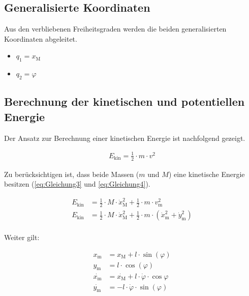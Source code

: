 \documentclass[
	pagesize,
	fontsize=12pt,
	paper=a4,
	oneside,
   reqno
]{scrartcl}
\begin{document}
\subsection{Generalisierte Koordinaten}

Aus den verbliebenen Freiheitsgraden werden die beiden generalisierten Koordinaten abgeleitet.

\begin{itemize}
    \item $q_{\mathrm{1}} = x_{\mathrm{M}}$
    \item $q_{\mathrm{2}} = \varphi$
\end{itemize}

\subsection{Berechnung der kinetischen und potentiellen Energie}

Der Ansatz zur Berechnung einer kinetischen Energie ist nachfolgend gezeigt.

\begin{align}\label{eq:Gleichung2}
    E_{\mathrm{kin}} = \frac{1}{2} \cdot m \cdot v^2
\end{align}

Zu berücksichtigen ist, dass beide Massen ($m$ und $M$) eine kinetische Energie besitzen (\autoref{eq:Gleichung3} und \autoref{eq:Gleichung4}).

\begin{align}
    E_{\mathrm{kin}} &= \frac{1}{2} \cdot M \cdot \dot{x}_{\mathrm{M}}^2 + \frac{1}{2} \cdot m \cdot v_{\mathrm{m}}^2 \label{eq:Gleichung3} \\
    E_{\mathrm{kin}} &= \frac{1}{2} \cdot M \cdot \dot{x}_{\mathrm{M}}^2 + \frac{1}{2} \cdot m \cdot \left(\dot{x}_{\mathrm{m}}^2 + \dot{y}_{\mathrm{m}}^2\right) \label{eq:Gleichung4}
\end{align} \\

Weiter gilt:

\begin{align*}
    x_{\mathrm{m}} &= x_{\mathrm{M}} + l \cdot \sin({\varphi}) \\
    y_{\mathrm{m}} &= l \cdot \cos({\varphi}) \\
    \dot{x_{\mathrm{m}}} &= \dot{x_{\mathrm{M}}} + l \cdot \dot{\varphi} \cdot \cos{\varphi} \\
    \dot{y_{\mathrm{m}}} &= -l \cdot \dot{\varphi} \cdot \sin({\varphi})
\end{align*}
\end{document}
